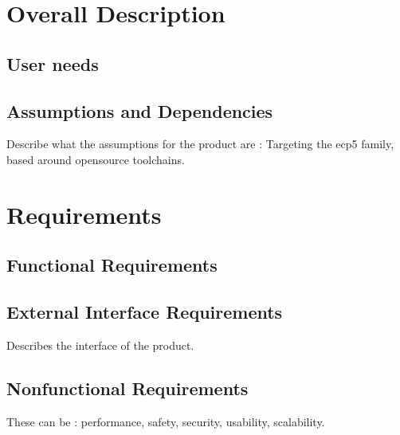 \section{Overall Description}

\subsection{User needs}

\subsection{Assumptions and Dependencies}

Describe what the assumptions for the product are : Targeting the ecp5 family, based around opensource toolchains.

\section{Requirements}

\subsection{Functional Requirements}

\subsection{External Interface Requirements}

Describes the interface of the product.

\subsection{Nonfunctional Requirements}

These can be : performance, safety, security, usability, scalability.

\newpage
